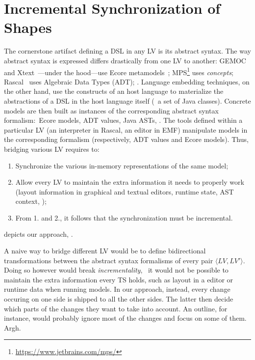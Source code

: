 \section{Incremental Synchronization of Shapes}
\label{sec:prism}

The cornerstone artifact defining a DSL in any LV is its abstract syntax.
The way abstract syntax is expressed differs drastically from one LV to another: GEMOC~\cite{bousse2016execution} and Xtext~\cite{bettini2016implementing}---under the hood---use Ecore metamodels~\cite{steinberg2008emf}; MPS\footnote{\url{https://www.jetbrains.com/mps/}} uses \emph{concepts}; Rascal~\cite{klint2010easy} uses Algebraic Data Types (ADT); \etc.
Language embedding techniques, on the other hand, use the constructs of an host language to materialize the abstractions of a DSL in the host language itself (\eg~a set of Java classes).
Concrete models are then built as instances of the corresponding abstract syntax formalism:~Ecore models, ADT values, Java ASTs, \etc.
The tools defined within a particular LV (an interpreter in Rascal, an editor in EMF) manipulate models in the corresponding formalism (respectively, ADT values and Ecore models).
Thus, bridging various LV requires to:
\begin{enumerate}
	\item Synchronize the various in-memory representations of the same model;
	\item Allow every LV to maintain the extra information it needs to properly work (layout information in graphical and textual editors, runtime state, AST context, \etc);
	\item From 1. and 2., it follows that the synchronization must be incremental.
\end{enumerate}

 depicts our approach, \prism.

A naive way to bridge different LV would be to define bidirectional transformations between the abstract syntax formalisms of every pair $\langle LV, LV' \rangle$.
Doing so however would break \emph{incrementality}, \ie~it would not be possible to maintain the extra information every TS holds, such as layout in a editor or runtime data when running models.
In our approach, instead, every change occuring on one side is shipped to all the other sides.
The latter then decide which parts of the changes they want to take into account.
An outline, for instance, would probably ignore most of the changes and focus on some of them. Argh.

